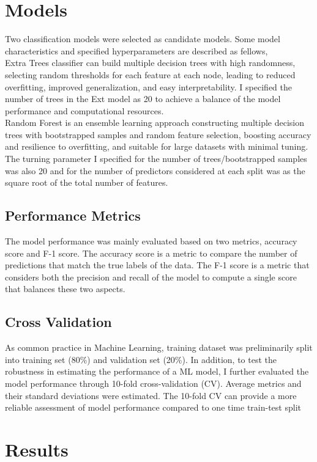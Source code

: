 \documentclass{article}
\begin{document}
\section{Models}
Two classification models were selected as candidate models. Some model characteristics and specified hyperparameters are described as fellows,\\
Extra Trees classifier can build multiple decision trees with high randomness, selecting random thresholds for each feature at each node, leading to reduced overfitting, improved generalization, and easy interpretability. I specified the number of trees in the Ext model as 20 to achieve a balance of the model performance and computational resources.\\
Random Forest is an ensemble learning approach constructing multiple decision trees with bootstrapped samples and random feature selection, boosting accuracy and resilience to overfitting, and suitable for large datasets with minimal tuning. The turning parameter I specified for the number of trees/bootstrapped samples was also 20 and for the number of predictors considered at each split was as the square root of the total number of features.

\subsection{Performance Metrics}
The model performance was mainly evaluated based on two metrics, accuracy score and F-1 score. The accuracy score is a metric to compare the number of predictions that match the true labels of the data. The F-1 score is a metric that considers both the precision and recall of the model to compute a single score that balances these two aspects.

\subsection{Cross Validation}
As common practice in Machine Learning, training dataset was preliminarily split into training set (80\%) and validation set (20\%). In addition, to test the robustness in estimating the performance of a ML model, I further evaluated the model performance through 10-fold cross-validation (CV). Average metrics and their standard deviations were estimated. The 10-fold CV can provide a more reliable assessment of model performance compared to one time train-test split

\section{Results}
\end{document}

